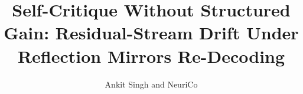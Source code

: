 \documentclass{article}
\title{Self-Critique Without Structured Gain: Residual-Stream Drift Under Reflection Mirrors Re-Decoding}
\author{Ankit Singh and NeuriCo}
\begin{document}
\maketitle

\begin{abstract}

\end{abstract}









\end{document}
